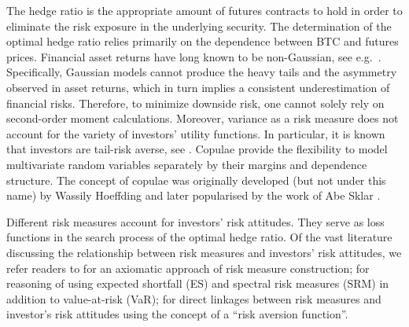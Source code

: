 \documentclass[11pt,a4paper,english]{article}
\providecommand{\natp}[1]{\textcolor{darkorange}{#1}}
\begin{document}
The hedge ratio is the appropriate amount of futures contracts to hold
in order to eliminate the risk exposure in the underlying security.   
The determination of the optimal hedge ratio relies primarily
on the dependence between BTC and futures prices.
Financial asset returns have long known to be non-Gaussian, see e.g.\
\citep{fama1963mandelbrot,Cont2001}. Specifically, Gaussian models
cannot produce the heavy tails and the asymmetry observed in 
asset returns, which in turn implies a consistent underestimation of
financial risks. 
Therefore, to minimize downside risk, one cannot solely rely on
second-order moment calculations. Moreover, variance as a risk measure
does not account for the variety of investors' utility functions. In
particular, it is known that  
investors are tail-risk averse, see \cite{menezes1980increasing}.
Copulae provide the flexibility to model multivariate random variables
separately by their margins and dependence structure.
The concept of copulae was originally developed (but not under this
name) by Wassily Hoeffding \citep{hoeffding1940masstabinvariante}
and later popularised by the work of Abe Sklar \citep{Sklar1959}.

Different risk measures account for investors' risk attitudes.
They serve as loss functions in the search process of the optimal
hedge ratio. Of the vast literature discussing the relationship between
risk measures and investors' risk attitudes, we refer readers to
\citet{artzner1999coherent} for an axiomatic 
approach of risk measure construction;
\citet{embrechts2002correlation} for reasoning of using expected
shortfall (ES) and spectral risk measures (SRM) in addition to
value-at-risk (VaR);
\citet{Acerbi2002} for direct linkages between risk measures and
investor's risk attitudes using the concept of a ``risk aversion
function''. 
\end{document}
